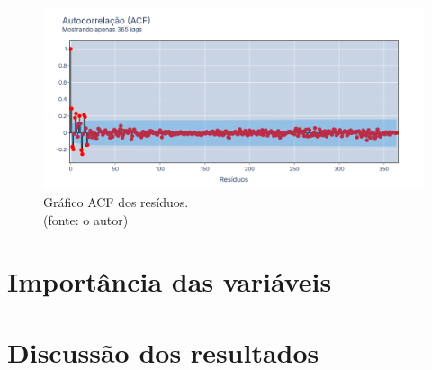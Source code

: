 \begin{figure}[!h]
\centering
\includegraphics[scale=0.33]{Figuras/jequiti/resultados/RF_WFV_LOG_RESID_ACF.png}
\caption{Gráfico ACF dos resíduos.\\(fonte: o autor)}
\label{fig:jequiti_RF_WFV_LOG_RESID_ACF}
\end{figure}
\clearpage

\section{Importância das variáveis}

\section{Discuss\~ao dos resultados}
